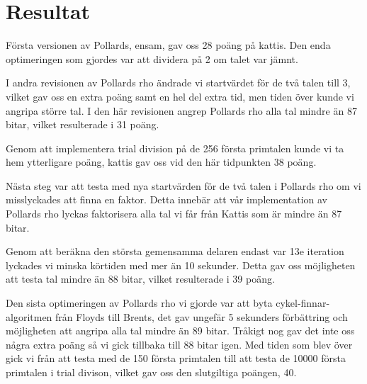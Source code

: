 \documentclass[a4paper,12pt]{article}
\renewcommand{\*}{\ensuremath{\cdot}}
\begin{document}
\section{Resultat}

Första versionen av Pollards, ensam, gav oss 28 poäng på kattis. Den enda optimeringen som gjordes var att dividera på 2 om talet var jämnt.

I andra revisionen av Pollards rho ändrade vi startvärdet för de två talen till 3, vilket gav oss en extra poäng samt en hel del extra tid, men tiden över kunde vi angripa större tal. I den här revisionen angrep Pollards rho alla tal mindre än 87 bitar, vilket resulterade i 31 poäng.

Genom att implementera trial division på de 256 första primtalen kunde vi ta hem ytterligare poäng, kattis gav oss vid den här tidpunkten 38 poäng.

Nästa steg var att testa med nya startvärden för de två talen i Pollards rho om vi misslyckades att finna en faktor. Detta innebär att vår implementation av Pollards rho lyckas faktorisera alla tal vi får från Kattis som är mindre än 87 bitar.

Genom att beräkna den största gemensamma delaren endast var 13e iteration lyckades vi minska körtiden med mer än 10 sekunder. Detta gav oss möjligheten att testa tal mindre än 88 bitar, vilket resulterade i 39 poäng.

Den sista optimeringen av Pollards rho vi gjorde var att byta cykel-finnar-algoritmen från Floyds till Brents, det gav ungefär 5 sekunders förbättring och möjligheten att angripa alla tal mindre än 89 bitar. Tråkigt nog gav det inte oss några extra poäng så vi gick tillbaka till 88 bitar igen. Med tiden som blev över gick vi från att testa med de 150 första primtalen till att testa de 10000 första primtalen i trial divison, vilket gav oss den slutgiltiga poängen, 40.
\end{document}
